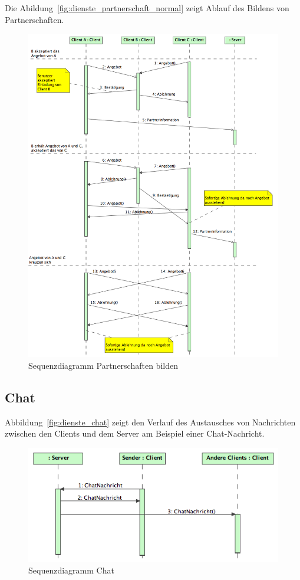 \documentclass[12pt,halfparskip]{scrartcl}
\begin{document}
Die Abildung~\vref{fig:dienste_partnerschaft_normal} zeigt Ablauf des Bildens von Partnerschaften.
\begin{figure}[h]
	\centering
	\includegraphics[width=\textwidth]{dienste_partnerschaft_normal}
	\caption{Sequenzdiagramm Partnerschaften bilden}
	\label{fig:dienste_partnerschaft_normal}
\end{figure}

\clearpage
\subsection{Chat}
\label{sub:nachrichtenaustausch_zwischen_client_und_server}
Abbildung~\vref{fig:dienste_chat} zeigt den Verlauf des Austausches von Nachrichten zwischen den Clients und dem Server am Beispiel einer Chat-Nachricht.
\begin{figure}[h]
	\centering
	\includegraphics[width=\textwidth]{dienste_chat}
	\caption{Sequenzdiagramm Chat}
	\label{fig:dienste_chat}
\end{figure}
\end{document}
